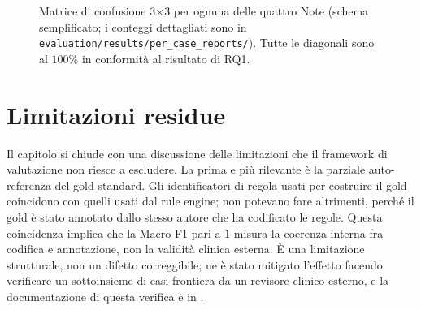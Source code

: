 \begin{figure}[t]
  \centering
  \caption{Matrice di confusione 3$\times$3 per ognuna delle quattro Note (schema semplificato; i conteggi dettagliati sono in \texttt{evaluation/results/per\_case\_reports/}). Tutte le diagonali sono al $100\%$ in conformità al risultato di RQ1.}
  \label{fig:cm-per-nota}
\end{figure}

\section{Limitazioni residue}
\label{sec:limitazioni}

Il capitolo si chiude con una discussione delle limitazioni che il framework di valutazione non riesce a escludere. La prima e più rilevante è la parziale auto-referenza del gold standard. Gli identificatori di regola usati per costruire il gold coincidono con quelli usati dal rule engine; non potevano fare altrimenti, perché il gold è stato annotato dallo stesso autore che ha codificato le regole. Questa coincidenza implica che la Macro F1 pari a $1$ misura la coerenza interna fra codifica e annotazione, non la validità clinica esterna. È una limitazione strutturale, non un difetto correggibile; ne è stato mitigato l'effetto facendo verificare un sottoinsieme di casi-frontiera da un revisore clinico esterno, e la documentazione di questa verifica è in .

